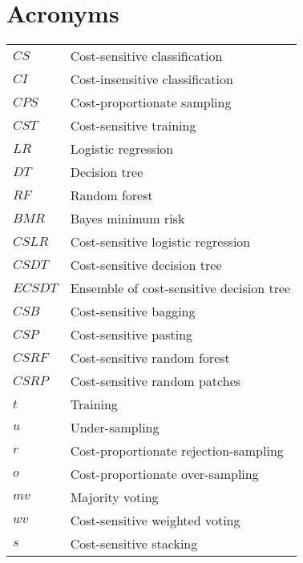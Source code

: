 
\chapter{Acronyms}

\begin{tabularx}{\textwidth}{ l X }
$CS$ 		& Cost-sensitive classification \\
$CI$    & Cost-insensitive classification \\ 
$CPS$    & Cost-proportionate sampling \\
$CST$    & Cost-sensitive training \\ 
$LR$  & Logistic regression \\
$DT$  & Decision tree  \\
$RF$ &  Random forest  \\
$BMR$ & Bayes minimum risk \\
$CSLR$ & Cost-sensitive logistic regression  \\
$CSDT$ & Cost-sensitive decision tree  \\
$ECSDT$ & Ensemble of cost-sensitive decision tree \\
$CSB$ & Cost-sensitive bagging\\
$CSP$ & Cost-sensitive pasting\\
$CSRF$ & Cost-sensitive random forest  \\
$CSRP$ & Cost-sensitive random patches  \\
$t$ & Training \\
$u$ & Under-sampling \\
$r$ & Cost-proportionate rejection-sampling \\
$o$ & Cost-proportionate over-sampling \\
$mv$ & Majority voting \\
$wv$ & Cost-sensitive weighted voting \\
$s$ & Cost-sensitive stacking \\
\end{tabularx}
